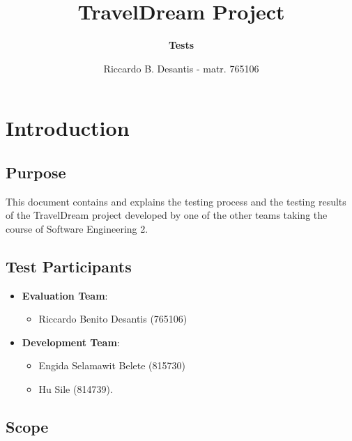 \documentclass[a4paper,12pt]{book}
\begin{document}
\title{\textbf{TravelDream Project}}
\author{\textbf{Tests}}
\date{Riccardo B. Desantis - matr. 765106}

\maketitle

\tableofcontents

\chapter{Introduction}

\section{Purpose}
This document contains and explains the testing process and the testing results of the TravelDream project developed by one of the other teams taking the course of Software Engineering 2.

\section{Test Participants}

\begin{itemize}
  \item \textbf{Evaluation Team}:
  \begin{itemize}
    \item Riccardo Benito Desantis (765106)
  \end{itemize}
  \item \textbf{Development Team}:
  \begin{itemize}
    \item Engida Selamawit Belete (815730)
    \item Hu Sile (814739).
  \end{itemize}
\end{itemize}

\section{Scope}
\end{document}
